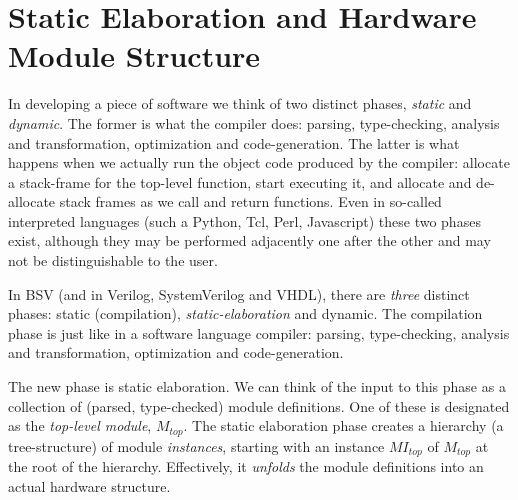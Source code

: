 
\section{Static Elaboration and Hardware Module Structure}

\label{Sec_Static_Elaboration}


In developing a piece of software we think of two distinct phases,
\emph{static} and \emph{dynamic}.  The former is what the compiler
does: parsing, type-checking, analysis and transformation,
optimization and code-generation.  The latter is what happens when we
actually run the object code produced by the compiler: allocate a
stack-frame for the top-level function, start executing it, and
allocate and de-allocate stack frames as we call and return functions.
Even in so-called interpreted languages (such a Python, Tcl, Perl,
Javascript) these two phases exist, although they may be performed
adjacently one after the other and may not be distinguishable to the
user.

In BSV (and in Verilog, SystemVerilog and VHDL), there are
\emph{three} distinct phases: static (compilation),
\emph{static-elaboration} and dynamic.  The compilation phase is just
like in a software language compiler: parsing, type-checking, analysis
and transformation, optimization and code-generation.

The new phase is static elaboration.  We can think of the input to
this phase as a collection of (parsed, type-checked) module
definitions.  One of these is designated as the \emph{top-level
module}, $M_{top}$.  The static elaboration phase creates a hierarchy
(a tree-structure) of module \emph{instances}, starting with an
instance $MI_{top}$ of $M_{top}$ at the root of the hierarchy.
Effectively, it \emph{unfolds} the module definitions into an actual
hardware structure.

